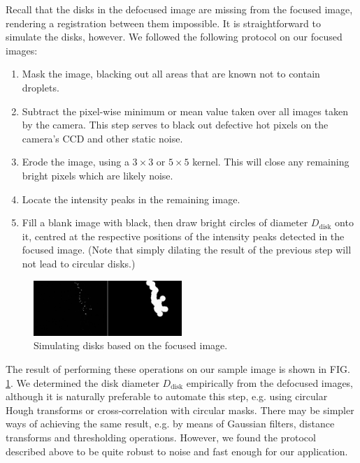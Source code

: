 \documentclass[floatfix,aip,rsi,reprint,graphicx]{revtex4-1}
\begin{document}
Recall that the disks in the defocused image are missing from the focused image,
rendering a registration between them impossible. It is straightforward to
simulate the disks, however. We followed the following protocol on our focused
images:
\begin{enumerate}
    \item Mask the image, blacking out all areas that are known not to contain
        droplets.
    \item Subtract the pixel-wise minimum or mean value taken over all images
        taken by the camera. This step serves to black out defective hot pixels
        on the camera's CCD and other static noise.
    \item Erode the image, using a $3\times 3$ or $5\times 5$ kernel. This will
        close any remaining bright pixels which are likely noise.
    \item Locate the intensity peaks in the remaining image.
    \item Fill a blank image with black, then draw bright circles of diameter
        $D_\text{disk}$ onto it, centred at the respective positions of the
        intensity peaks detected in the focused image. (Note that simply dilating
        the result of the previous step will not lead to circular disks.)
\end{enumerate}
\begin{figure}
    \centering
    \includegraphics[width=0.5\textwidth]{orb_images/dilation.jpg}
    \caption{Simulating disks based on the focused image. \label{fig:making-disks}}
\end{figure}

The result of performing these operations on our sample image is shown in FIG.
\ref{fig:making-disks}. We determined the disk diameter $D_\text{disk}$
empirically from the defocused images, although it is naturally preferable to
automate this step, e.g. using circular Hough transforms or cross-correlation
with circular masks. There may be simpler ways of achieving the same result,
e.g. by means of Gaussian filters, distance transforms and thresholding
operations. However, we found the protocol described above to be quite robust to
noise and fast enough for our application.
\end{document}
